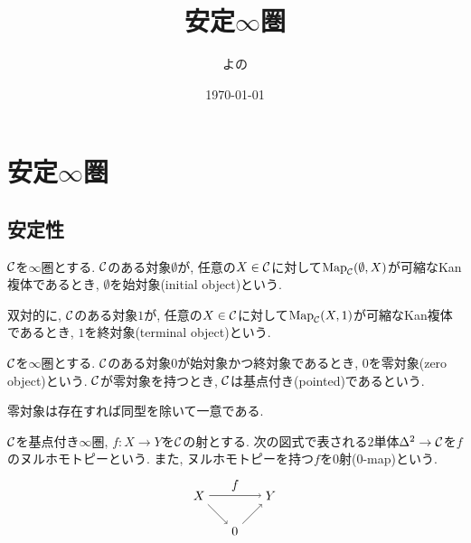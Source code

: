 \documentclass[uplatex, a4paper, 14Q, dvipdfmx]{jsarticle}
\title{安定\texorpdfstring{$\infty$}{infty}圏}
\author{よの}
\date{\today}
\begin{document}
\maketitle

\begin{abstract}
\end{abstract}

\tableofcontents

\section{安定\texorpdfstring{$\infty$}{infty}圏}

\subsection{安定性}

\begin{definition}[始対象と終対象]
  $\mathcal{C}$を$\infty$圏とする.
  $\mathcal{C}$のある対象$\emptyset$が, 任意の$X \in \mathcal{C}$に対して$\mathrm{Map}_{\mathcal{C}}(\emptyset,X)$が可縮なKan複体であるとき, $\emptyset$を始対象(initial object)という. 

  双対的に, $\mathcal{C}$のある対象$1$が, 任意の$X \in \mathcal{C}$に対して$\mathrm{Map}_{\mathcal{C}}(X,1)$が可縮なKan複体であるとき, $1$を終対象(terminal object)という. 
\end{definition}

\begin{definition}
  $\mathcal{C}$を$\infty$圏とする.
  $\mathcal{C}$のある対象$0$が始対象かつ終対象であるとき, $0$を零対象(zero object)という.
  $\mathcal{C}$が零対象を持つとき, $\mathcal{C}$は基点付き(pointed)であるという.
\end{definition}

\begin{remark}
  零対象は存在すれば同型を除いて一意である. 
\end{remark}

\begin{definition}[ヌルホモトピー]
  $\mathcal{C}$を基点付き$\infty$圏, $f : X \to Y$を$\mathcal{C}$の射とする.
  次の図式で表される$2$単体$\Delta^2 \to \mathcal{C}$を$f$のヌルホモトピーという.
  また, ヌルホモトピーを持つ$f$を$0$射($0$-map)という. 
  \[
    \begin{tikzpicture}[auto,->]
      \node (0) at (1,0) {$0$};
      \node (X) at (0,1) {$X$};
      \node (Y) at (2,1) {$Y$};
      \draw (X) -- node {$f$} (Y);
      \draw (X) -- (0);
      \draw (0) -- (Y);
    \end{tikzpicture}
  \]
\end{definition}
\end{document}
